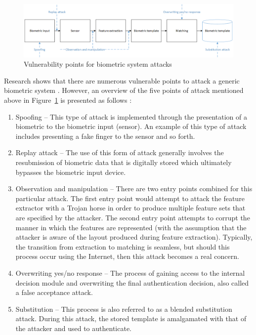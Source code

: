     \begin{figure}[htbp!] 
    \centering    
    \includegraphics[width=1.0\textwidth]{Chapter2/Figs/Figure2-3.png}
    \caption[Vulnerability points for biometric system attacks]{Vulnerability points for biometric system attacks}
    \label{fig:Vulnerability points for biometric system attacks}
    \end{figure}
    
    Research shows that there are numerous vulnerable points to attack a generic biometric system \citep{Ratha2001}. However, an overview of the five points of attack mentioned above in Figure~\ref{fig:Vulnerability points for biometric system attacks} is presented as follows \citep{Karimovich2016, Patel2015, Ratha2001, Rathgeb2011}:
    
    \begin{enumerate}[label=\roman*.]
    
        \item Spoofing – This type of attack is implemented through the presentation of a   biometric to the biometric input (sensor). An example of this type of attack includes presenting a fake finger to the sensor and so forth.
        \item Replay attack – The use of this form of attack generally involves the resubmission of biometric data that is digitally stored which ultimately bypasses the biometric input device.
        \item Observation and manipulation – There are two entry points combined for this particular attack. The first entry point would attempt to attack the feature extractor with a Trojan horse in order to produce multiple feature sets that are specified by the attacker. The second entry point attempts to corrupt the manner in which the features are represented (with the assumption that the attacker is aware of the layout produced during feature extraction). Typically, the transition from extraction to matching is seamless, but should this process occur using the Internet, then this attack becomes a real concern.
        \item Overwriting yes/no response – The process of gaining access to the internal decision module and overwriting the final authentication decision, also called a false acceptance attack.
        \item Substitution – This process is also referred to as a blended substitution attack. During this attack, the stored template is amalgamated with that of the attacker and used to authenticate.

    \end{enumerate}
    
